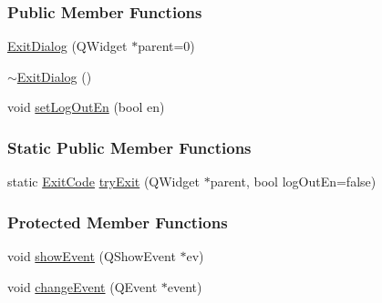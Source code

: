 \subsubsection*{Public Member Functions}
\begin{DoxyCompactItemize}
\item 
\mbox{\hyperlink{classExitDialog_aa1b3d3b53b599a47b2c7d70d04ec4668}{Exit\+Dialog}} (Q\+Widget $\ast$parent=0)
\item 
\mbox{\hyperlink{classExitDialog_ae009cbdbc1b06410845a1afe2d518149}{$\sim$\+Exit\+Dialog}} ()
\item 
void \mbox{\hyperlink{classExitDialog_ab44c70526c323e87ee0b3e9e3daad41a}{set\+Log\+Out\+En}} (bool en)
\end{DoxyCompactItemize}
\subsubsection*{Static Public Member Functions}
\begin{DoxyCompactItemize}
\item 
static \mbox{\hyperlink{classExitDialog_a750dfbbef3dec32bec821122ee7b910c}{Exit\+Code}} \mbox{\hyperlink{classExitDialog_a8c287b8910a1e54c9fed6dd172fbd134}{try\+Exit}} (Q\+Widget $\ast$parent, bool log\+Out\+En=false)
\end{DoxyCompactItemize}
\subsubsection*{Protected Member Functions}
\begin{DoxyCompactItemize}
\item 
void \mbox{\hyperlink{classExitDialog_ad39269ff91b1b949ab12c8ecbcefa6f6}{show\+Event}} (Q\+Show\+Event $\ast$ev)
\item 
void \mbox{\hyperlink{classExitDialog_a460c6fce45208626b1ec54f7ed9e0629}{change\+Event}} (Q\+Event $\ast$event)
\end{DoxyCompactItemize}
